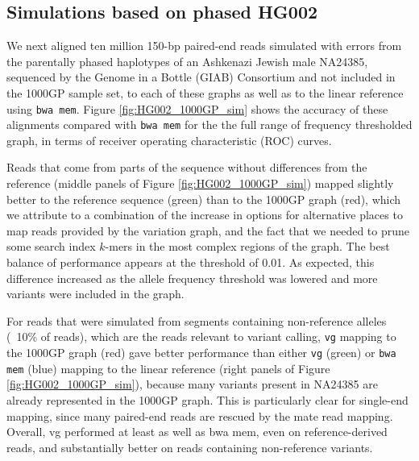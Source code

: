 \subsection{Simulations based on phased HG002}
\label{sec:1000GP_sim}

We next aligned ten million 150-bp paired-end reads simulated with errors from the parentally phased haplotypes of an Ashkenazi Jewish male NA24385, sequenced by the Genome in a Bottle (GIAB) Consortium \cite{zook2016extensive} and not included in the 1000GP sample set, to each of these graphs as well as to the linear reference using {\tt bwa mem}.
Figure \ref{fig:HG002_1000GP_sim} shows the accuracy of these alignments compared with {\tt bwa mem} for the the full range of frequency thresholded graph, in terms of receiver operating characteristic (ROC) curves.

Reads that come from parts of the sequence without differences from the reference (middle panels of Figure \ref{fig:HG002_1000GP_sim}) mapped slightly better to the reference sequence (green) than to the 1000GP graph (red), which we attribute to a combination of the increase in options for alternative places to map reads provided by the variation graph, and the fact that we needed to prune some search index $k$-mers in the most complex regions of the graph.
The best balance of performance appears at the threshold of 0.01.
As expected, this difference increased as the allele frequency threshold was lowered and more variants were included in the graph.

For reads that were simulated from segments containing non-reference alleles (~10\% of reads), which are the reads relevant to variant calling, {\tt vg} mapping to the 1000GP graph (red) gave better performance than either {\tt vg} (green) or {\tt bwa mem} (blue) mapping to the linear reference (right panels of Figure \ref{fig:HG002_1000GP_sim}), because many variants present in NA24385 are already represented in the 1000GP graph.
This is particularly clear for single-end mapping, since many paired-end reads are rescued by the mate read mapping.
Overall, vg performed at least as well as bwa mem, even on reference-derived reads, and substantially better on reads containing non-reference variants.

